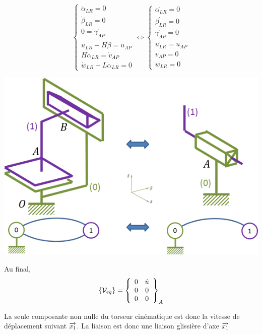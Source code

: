 \documentclass[10pt]{article}
\begin{document}
\noindent\begin{minipage}[c]{.45\linewidth}
$$
\left\{
\begin{array}{l}
\dot{\alpha}_{LR}=0 \\
\dot{\beta}_{LR}=0 \\
0=\dot{\gamma_{AP}} \\
\dot{u}_{LR}-H\dot{\beta} =\dot{u}_{AP} \\
H\dot{\alpha}_{LR}= \dot{v}_{AP} \\
\dot{w}_{LR}+L\dot{\alpha} _{LR}= 0
\end{array}
\right.
\Longleftrightarrow
\left\{
\begin{array}{l}
\dot{\alpha_{LR}}=0 \\
\dot{\beta_{LR}}=0 \\
\dot{\gamma_{AP}}=0 \\
\dot{u_{LR}} =\dot{u_{AP}} \\
 \dot{v_{AP}} = 0\\
\dot{w_{LR}} = 0
\end{array}
\right.
$$
\end{minipage}\hfill
\begin{minipage}[c]{.5\linewidth}
\begin{center}
\includegraphics[width=\textwidth]{images/cf_eq}
\end{center}
\end{minipage}

Au final, 
$$
\{\mathcal{V}_{eq}\}=
\torseurcol{0}{0}{0}{\dot{u}}{0}{0}{A}
$$

\vspace{.25cm}

La seule composante non nulle du torseur cinématique est donc la vitesse de déplacement suivant $\vect{x_1}$. La liaison est donc une liaison glissière d'axe $\vect{x_1}$
\end{document}
